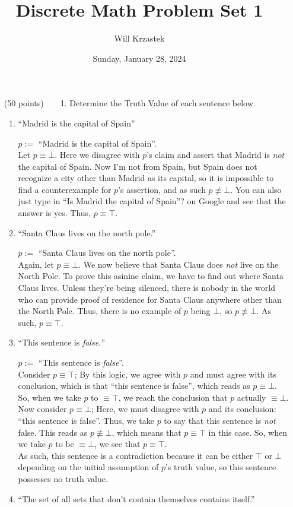 \documentclass[11pt,a4paper]{article}
\begin{document}
 
\title{Discrete Math Problem Set 1}
\author{Will Krzastek}
\date{Sunday, January 28, 2024}
\maketitle
\begin{enumerate}
    \item[(50 points)~~~~1.]
    Determine the Truth Value of each sentence below.
    \begin{enumerate}
        \item 
        ``Madrid is the capital of Spain''
        
        $p := $ ``Madrid is the capital of Spain''. \\ Let $p \equiv \bot$. Here we disagree with $p$'s claim and assert that Madrid is \emph{not} the capital of Spain. Now I'm not from Spain, but Spain does not recognize a city other than Madrid as its capital, so it is impossible to find a counterexample for $p$'s assertion, and as such $p \not\equiv \bot$. You can also just type in ``Is Madrid the capital of Spain''? on Google and see that the answer is yes. Thus, $p \equiv \top$.
        \item 
        ``Santa Claus lives on the north pole.''

        $p := $ ``Santa Claus lives on the north pole''. \\ Again, let $p \equiv \bot$. We now believe that Santa Claus does \emph{not} live on the North Pole. To prove this asinine claim, we have to find out where Santa Claus lives. Unless they're being silenced, there is nobody in the world who can provide proof of residence for Santa Claus anywhere other than the North Pole. Thus, there is no example of $p$ being $\bot$, so $p \not\equiv \bot$. As such, $p \equiv \top$. 
      \item
        ``This sentence is \emph{false.}''

        $p := $ ``This sentence is \emph{false}''. \\ Consider $p \equiv \top$; By this logic, we agree with $p$ and must agree with its conclusion, which is that ``this sentence is false'', which reads as $p \equiv \bot$. So, when we take $p$ to $\equiv \top$, we reach the conclusion that $p$ actually $\equiv \bot$.  \\ Now consider $p \equiv \bot$; Here, we must disagree with $p$ and its conclusion: ``this sentence is false''. Thus, we take $p$ to say that this sentence is \emph{not} false. This reads as $p \not\equiv \bot$, which means that $p \equiv \top$ in this case. So, when we take $p$ to be $\equiv \bot$, we see that $p \equiv \top$. \\ As such, this sentence is a contradiction because it can be either $\top$ or $\bot$ depending on the initial assumption of $p$'s truth value, so this sentence possesses no truth value.  
      \item
        ``The set of all sets that don't contain themselves contains itself.''%


\end{enumerate}
\end{enumerate}
\end{document}
